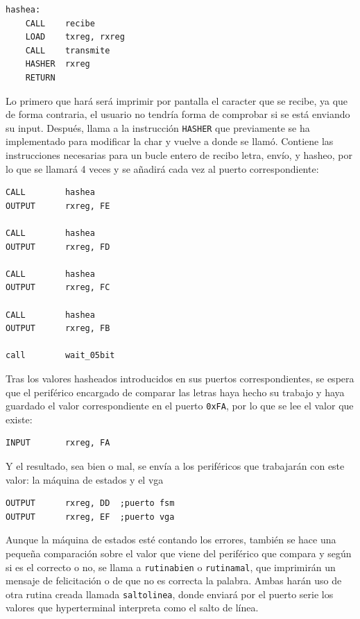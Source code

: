 \documentclass[a4paper, 12pt]{report}
\begin{document}
\newpage

\begin{lstlisting}[caption={Rutina hashea}]
hashea:
    CALL    recibe
    LOAD    txreg, rxreg
    CALL    transmite
    HASHER  rxreg
    RETURN
\end{lstlisting}


Lo primero que hará será imprimir por pantalla el caracter que se recibe, ya que de forma contraria, el usuario no tendría forma de comprobar si se está enviando su input. Después, llama a la instrucción \texttt{HASHER} que previamente se ha implementado para modificar la char y vuelve a donde se llamó. Contiene las instrucciones necesarias para un bucle entero de recibo letra, envío, y hasheo, por lo que se llamará 4 veces y se añadirá cada vez al puerto correspondiente:

\begin{lstlisting}[caption={Hashea chars y envia al puerto}]
CALL        hashea
OUTPUT      rxreg, FE

CALL        hashea
OUTPUT      rxreg, FD

CALL        hashea
OUTPUT      rxreg, FC

CALL        hashea
OUTPUT      rxreg, FB

call        wait_05bit
\end{lstlisting}

Tras los valores hasheados introducidos en sus puertos correspondientes, se espera que el periférico encargado de comparar las letras haya hecho su trabajo y haya guardado el valor correspondiente en el puerto \texttt{0xFA}, por lo que se lee el valor que existe:

\begin{lstlisting}[caption={Recibir resultado XOR}]
INPUT       rxreg, FA
\end{lstlisting}

Y el resultado, sea bien o mal, se envía a los periféricos que trabajarán con este valor: la máquina de estados y el vga

\begin{lstlisting}[caption={Comunicación de resultados a FSM y VGA}]
OUTPUT      rxreg, DD  ;puerto fsm
OUTPUT      rxreg, EF  ;puerto vga
\end{lstlisting}

Aunque la máquina de estados esté contando los errores, también se hace una pequeña comparación sobre el valor que viene del periférico que compara y según si es el correcto o no, se llama a \texttt{rutinabien} o \texttt{rutinamal}, que imprimirán un mensaje de felicitación o de que no es correcta la palabra. Ambas harán uso de otra rutina creada llamada \texttt{saltolinea}, donde enviará por el puerto serie los valores que hyperterminal interpreta como el salto de línea.
\end{document}
